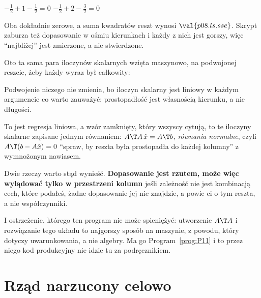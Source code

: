 \begin{fr}
\begin{ansblock}
$-\frac{1}{2} + 1 - \frac{1}{2} = 0$ \qquad
$-\frac{1}{2} + 2 - \frac{3}{2} = 0$
\end{ansblock}

Oba dokładnie zerowe, a suma kwadratów reszt wynosi $\val{p08.ls.sse}$. Skrypt
zaburza też dopasowanie w ośmiu kierunkach i każdy z nich jest gorszy, więc
\enquote{najbliżej} jest zmierzone, a nie stwierdzone.

Oto ta sama para iloczynów skalarnych wzięta maszynowo, na podwojonej reszcie,
żeby każdy wyraz był całkowity:


Podwojenie niczego nie zmienia, bo iloczyn skalarny jest liniowy w każdym
argumencie \dash{} co warto zauważyć: prostopadłość jest własnością kierunku, a
nie długości.
\end{fr}


\begin{fr}
\begin{aibox}
To jest regresja liniowa, a wzór zamknięty, który wszyscy cytują, to te iloczyny
skalarne zapisane jednym równaniem: $A\T A\,\hat{x} = A\T b$, \emph{równania
normalne}, czyli $A\T(b - A\hat{x}) = 0$ \dash{} \enquote{spraw, by reszta
była prostopadła do każdej kolumny} \dash{} z wymnożonym nawiasem.

Dwie rzeczy warto stąd wynieść. \textbf{Dopasowanie jest rzutem, może więc
wylądować tylko w przestrzeni kolumn} \dash{} jeśli zależność nie jest
kombinacją cech, które podałeś, żadne dopasowanie jej nie znajdzie, a powie ci
o tym reszta, a nie współczynniki.

I ostrzeżenie, którego ten program nie może spieniężyć: utworzenie $A\T A$ i
rozwiązanie tego układu to najgorszy sposób na maszynie, z powodu, który dotyczy
uwarunkowania, a nie algebry. Ma go Program~\ref{prog:P11} i to przez niego
kod produkcyjny nie idzie tu za podręcznikiem.
\end{aibox}
\end{fr}

\section{Rząd narzucony celowo}
\label{sec:P08-low-rank}

